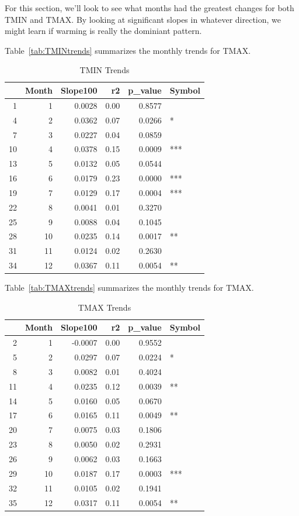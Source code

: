 \documentclass{article}\usepackage[]{graphicx}\usepackage[]{color}
\begin{document}
For this section, we'll look to see what months had the greatest changes for both TMIN and TMAX. By looking at significant slopes in whatever direction, we might learn if warming is really the dominiant pattern. 

Table~\ref{tab:TMINtrends} summarizes the monthly trends for TMAX.

\begin{table}[ht]
\centering
\begin{tabular}{rrrrrl}
  \hline
 & Month & Slope100 & r2 & p\_value & Symbol \\ 
  \hline
1 & 1 & 0.0028 & 0.00 & 0.8577 &  \\ 
  4 & 2 & 0.0362 & 0.07 & 0.0266 & * \\ 
  7 & 3 & 0.0227 & 0.04 & 0.0859 &  \\ 
  10 & 4 & 0.0378 & 0.15 & 0.0009 & *** \\ 
  13 & 5 & 0.0132 & 0.05 & 0.0544 &  \\ 
  16 & 6 & 0.0179 & 0.23 & 0.0000 & *** \\ 
  19 & 7 & 0.0129 & 0.17 & 0.0004 & *** \\ 
  22 & 8 & 0.0041 & 0.01 & 0.3270 &  \\ 
  25 & 9 & 0.0088 & 0.04 & 0.1045 &  \\ 
  28 & 10 & 0.0235 & 0.14 & 0.0017 & ** \\ 
  31 & 11 & 0.0124 & 0.02 & 0.2630 &  \\ 
  34 & 12 & 0.0367 & 0.11 & 0.0054 & ** \\ 
   \hline
\end{tabular}
\caption{TMIN Trends} 
\end{table}


Table~\ref{tab:TMAXtrends} summarizes the monthly trends for TMAX.

\begin{table}[ht]
\centering
\begin{tabular}{rrrrrl}
  \hline
 & Month & Slope100 & r2 & p\_value & Symbol \\ 
  \hline
2 & 1 & -0.0007 & 0.00 & 0.9552 &  \\ 
  5 & 2 & 0.0297 & 0.07 & 0.0224 & * \\ 
  8 & 3 & 0.0082 & 0.01 & 0.4024 &  \\ 
  11 & 4 & 0.0235 & 0.12 & 0.0039 & ** \\ 
  14 & 5 & 0.0160 & 0.05 & 0.0670 &  \\ 
  17 & 6 & 0.0165 & 0.11 & 0.0049 & ** \\ 
  20 & 7 & 0.0075 & 0.03 & 0.1806 &  \\ 
  23 & 8 & 0.0050 & 0.02 & 0.2931 &  \\ 
  26 & 9 & 0.0062 & 0.03 & 0.1663 &  \\ 
  29 & 10 & 0.0187 & 0.17 & 0.0003 & *** \\ 
  32 & 11 & 0.0105 & 0.02 & 0.1941 &  \\ 
  35 & 12 & 0.0317 & 0.11 & 0.0054 & ** \\ 
   \hline
\end{tabular}
\caption{TMAX Trends} 
\end{table}
\end{document}

